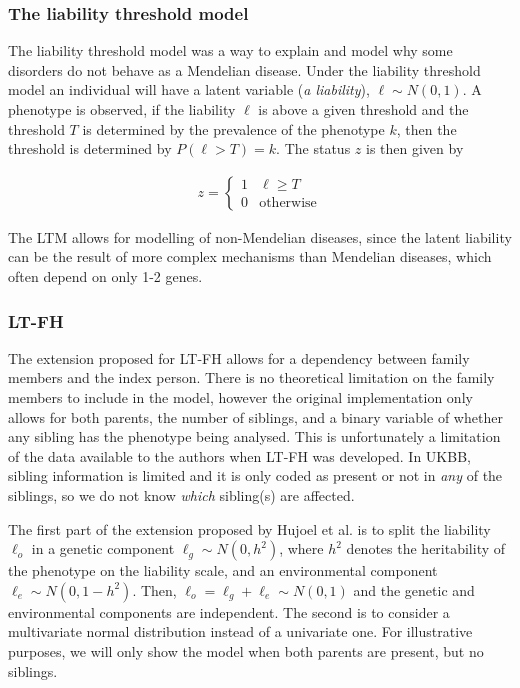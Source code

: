 \subsubsection{The liability threshold model}
The liability threshold model was a way to explain and model why some disorders do not behave as a Mendelian disease. Under the liability threshold model an individual will have a latent variable (\textit{a liability}), $ \ell \sim N(0,1)$. A phenotype is observed, if the liability $ \ell $ is above a given threshold and the threshold $ T $ is determined by the prevalence of the phenotype $ k $, then the threshold is determined by $ P(\ell > T) = k $. The status $ z $ is then given by 

\begin{align*}
z = 
\begin{cases}
1 & \ell \geq T \\
0 & \text{otherwise}
\end{cases}
\end{align*}

The LTM allows for modelling of non-Mendelian diseases, since the latent liability can be the result of more complex mechanisms than Mendelian diseases, which often depend on only 1-2 genes. 


\subsubsection{LT-FH}
The extension proposed for LT-FH allows for a dependency between family members and the index person. There is no theoretical limitation on the family members to include in the model, however the original implementation only allows for both parents, the number of siblings, and a binary variable of whether any sibling has the phenotype being analysed. This is unfortunately a limitation of the data available to the authors when LT-FH was developed. In UKBB, sibling information is limited and it is only coded as present or not in \textit{any} of the siblings, so we do not know \textit{which} sibling(s) are affected. 

The first part of the extension proposed by Hujoel et al. is to split the liability $ \ell_o $ in a genetic component $ \ell_g \sim N(0,h^2) $, where $ h^2 $ denotes the heritability of the phenotype on the liability scale, and an environmental component $ \ell_e \sim N(0, 1-h^2) $. Then, $ \ell_o = \ell_g + \ell_e \sim N(0,1) $ and the genetic and environmental components are independent. The second is to consider a multivariate normal distribution instead of a univariate one. For illustrative purposes, we will only show the model when both parents are present, but no siblings. 

